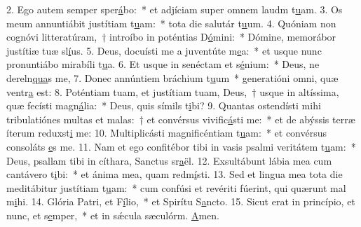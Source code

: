 2. Ego autem semper sper\uline{á}bo:~* et adjíciam super omnem laudm t\uline{u}am.
3. Os meum annuntiábit justítiam t\uline{u}am:~* tota die salutár t\uline{u}um.
4. Quóniam non cognóvi litteratúram,~† introíbo in poténtias D\uline{ó}mini:~* Dómine, memorábor justítiæ tuæ sl\uline{í}us.
5. Deus, docuísti me a juventúte m\uline{e}a:~* et usque nunc pronuntiábo mirabíli t\uline{u}a.
6. Et usque in senéctam et s\uline{é}nium:~* Deus, ne dereln\uline{qua}s me,
7. Donec annúntiem bráchium t\uline{u}um~* generatióni omni, quæ ventr\uline{a} est:
8. Poténtiam tuam, et justítiam tuam, Deus,~† usque in altíssima, quæ fecísti magn\uline{á}lia:~* Deus, quis símils t\uline{i}bi?
9. Quantas ostendísti mihi tribulatiónes multas et malas:~† et convérsus vivific\uline{á}sti me:~* et de abýssis terræ íterum reduxst\uline{i} me:
10. Multiplicásti magnificéntiam t\uline{u}am:~* et convérsus consoláts \uline{e}s me.
11. Nam et ego confitébor tibi in vasis psalmi veritátem t\uline{u}am:~* Deus, psallam tibi in cíthara, Sanctus sr\uline{a}ël.
12. Exsultábunt lábia mea cum cantávero t\uline{i}bi:~* et ánima mea, quam redm\uline{í}sti.
13. Sed et lingua mea tota die meditábitur justítiam t\uline{u}am:~* cum confúsi et revériti fúerint, qui quærunt mal m\uline{i}hi.
14. Glória Patri, et F\uline{í}lio,~* et Spirítu S\uline{a}ncto.
15. Sicut erat in princípio, et nunc, et s\uline{e}mper,~* et in sǽcula sæculórm. \uline{A}men.
